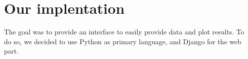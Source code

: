 \section{Our implentation}
	The goal was to provide an interface to easily provide data and plot results.
	To do so, we decided to use Python as primary language, and Django for the web part.